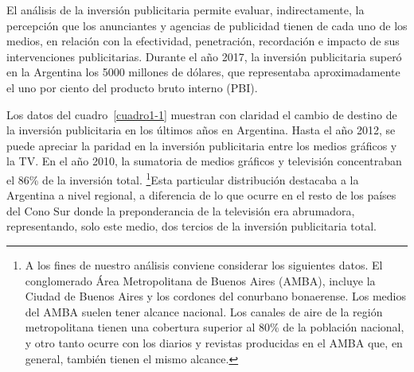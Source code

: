 El análisis de la inversión publicitaria  permite evaluar, indirectamente, la percepción que los anunciantes y agencias de publicidad tienen de cada uno de los medios, en relación con la efectividad, penetración, recordación e impacto de sus intervenciones publicitarias. Durante el año 2017, la inversión publicitaria superó en la Argentina los \num{5000} millones de dólares, que representaba aproximadamente el uno por ciento del producto bruto interno (PBI).

Los datos del cuadro~\ref{cuadro1-1} muestran con claridad el cambio de destino de la inversión publicitaria en los últimos años en Argentina. Hasta el año 2012, se puede apreciar la paridad en la inversión publicitaria entre los medios gráficos y la TV. En el año 2010, la sumatoria de medios gráficos y televisión concentraban el 86\% de la inversión total. \footnote{A los fines de nuestro análisis conviene considerar los siguientes datos. El conglomerado Área Metropolitana de Buenos Aires (AMBA), incluye la Ciudad de Buenos Aires y los cordones del conurbano bonaerense. Los medios del AMBA suelen tener alcance nacional. Los canales de aire de la región metropolitana tienen una cobertura superior al 80\% de la población nacional, y otro tanto ocurre con los diarios y revistas producidas en el AMBA que, en general, también tienen el mismo alcance.}Esta particular distribución destacaba a la Argentina a nivel regional, a diferencia de lo que ocurre en el resto de los países del Cono Sur donde la preponderancia de la televisión era  abrumadora, representando, solo este medio, dos tercios de la inversión publicitaria total.

